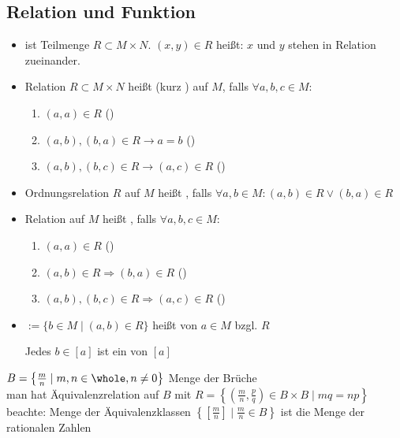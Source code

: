 \subsection{Relation und Funktion}
\begin{*definition}[Relation]
	\begin{itemize}
		\item {} ist Teilmenge $R\subset M\times N$. $(x,y)\in R$ heißt: $x$ und $y$ stehen in Relation zueinander.
		\item Relation $R\subset M\times N$ heißt  (kurz ) auf $M$, falls $\forall a,b,c\in M$:
		\begin{enumerate}[label={\alph*)}]
			\item $(a,a)\in R$ ()
			\item $(a,b),(b,a)\in R \rightarrow a=b$ ()
			\item $(a,b),(b,c)\in R \rightarrow (a,c)\in R$ ()
		\end{enumerate}
		\item Ordnungsrelation $R$ auf $M$ heißt , falls $\forall a,b\in M: (a,b)\in R \lor (b,a)\in R$
		\item Relation auf $M$ heißt , falls $\forall a,b,c\in M$:
		\begin{enumerate}[label={\alph*)}]
			\item $(a,a)\in R$ ()
			\item $(a,b)\in R \Rightarrow (b,a)\in R$ ()
			\item $(a,b),(b,c)\in R \Rightarrow (a,c)\in R$ ()
		\end{enumerate}
		\item \mathsymbol{[a]}{$[a]$}$:=\{b\in M\mid (a,b)\in R\}$ heißt  von $a\in M$ bzgl. $R$
		
		Jedes $b\in [a]$ ist ein  von $[a]$
	\end{itemize}
\end{*definition}

\begin{example}
	$B=\left\lbrace \frac{m}{n}\mid m,n\in\whole,n\neq 0 \right\rbrace$ Menge der Brüche \\
	man hat Äquivalenzrelation auf $B$ mit $R=\left\lbrace\left( \frac{m}{n},\frac{p}{q}\right)\in B\times B \mid mq=np\right\rbrace$ \\
	beachte: Menge der Äquivalenzklassen $\left\lbrace\left[ \frac{m}{n}\right]\mid \frac{m}{n}\in B \right\rbrace$ ist die Menge der rationalen Zahlen
\end{example}

